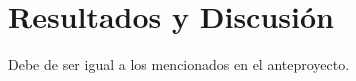 \chapter{Resultados y Discusión}
\label{ch:resultados}

Debe de ser igual a los mencionados en el anteproyecto.